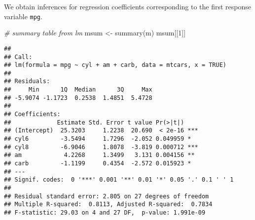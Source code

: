 \documentclass[
  ignorenonframetext,
]{beamer}
\newenvironment{Shaded}{\begin{snugshade}}{\end{snugshade}}
\newcommand{\CommentTok}[1]{\textcolor[rgb]{0.56,0.35,0.01}{\textit{#1}}}
\newcommand{\DecValTok}[1]{\textcolor[rgb]{0.00,0.00,0.81}{#1}}
\newcommand{\FunctionTok}[1]{\textcolor[rgb]{0.00,0.00,0.00}{#1}}
\newcommand{\NormalTok}[1]{#1}
\newcommand{\OtherTok}[1]{\textcolor[rgb]{0.56,0.35,0.01}{#1}}
\begin{document}
\begin{frame}[fragile]{}
\protect\hypertarget{section-3}{}
We obtain inferences for regression coefficients corresponding to the
first response variable \texttt{mpg}.

\vspace{12pt}
\tiny

\begin{Shaded}
\begin{Highlighting}[]
\CommentTok{\# summary table from lm}
\NormalTok{msum }\OtherTok{\textless{}{-}} \FunctionTok{summary}\NormalTok{(m)}
\NormalTok{msum[[}\DecValTok{1}\NormalTok{]]}
\end{Highlighting}
\end{Shaded}

\begin{verbatim}
## 
## Call:
## lm(formula = mpg ~ cyl + am + carb, data = mtcars, x = TRUE)
## 
## Residuals:
##     Min      1Q  Median      3Q     Max 
## -5.9074 -1.1723  0.2538  1.4851  5.4728 
## 
## Coefficients:
##             Estimate Std. Error t value Pr(>|t|)    
## (Intercept)  25.3203     1.2238  20.690  < 2e-16 ***
## cyl6         -3.5494     1.7296  -2.052 0.049959 *  
## cyl8         -6.9046     1.8078  -3.819 0.000712 ***
## am            4.2268     1.3499   3.131 0.004156 ** 
## carb         -1.1199     0.4354  -2.572 0.015923 *  
## ---
## Signif. codes:  0 '***' 0.001 '**' 0.01 '*' 0.05 '.' 0.1 ' ' 1
## 
## Residual standard error: 2.805 on 27 degrees of freedom
## Multiple R-squared:  0.8113, Adjusted R-squared:  0.7834 
## F-statistic: 29.03 on 4 and 27 DF,  p-value: 1.991e-09
\end{verbatim}
\end{frame}
\end{document}
